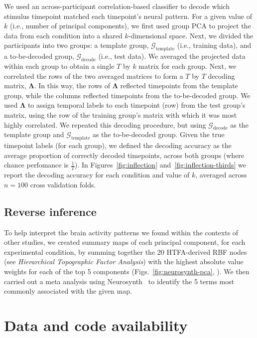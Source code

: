 \documentclass[english, 11pt]{article}
\begin{document}
We used an across-participant correlation-based classifier to decode which
stimulus timepoint matched each timepoint's neural pattern. For a given value
of $k$ (i.e., number of principal components), we first used group PCA to
project the data from each condition into a shared $k$-dimensional space. Next,
we divided the participants into two groups: a template group,
$\mathcal{G}_{\mathrm{template}}$ (i.e., training data), and a to-be-decoded
group, $\mathcal{G}_{\mathrm{decode}}$ (i.e., test data). We averaged the
projected data within each group to obtain a single $T$ by $k$ matrix for each
group. Next, we correlated the rows of the two averaged matrices to form a $T$
by $T$ decoding matrix, $\mathbf{\Lambda}$. In this way, the rows of
$\mathbf{\Lambda}$ reflected timepoints from the template group, while the
columns reflected timepoints from the to-be-decoded group. We used
$\mathbf{\Lambda}$ to assign temporal labels to each timepoint (row) from the
test group's matrix, using the row of the training group's matrix with which it
was most highly correlated. We repeated this decoding procedure, but using
$\mathcal{G}_{\mathrm{decode}}$ as the template group and
$\mathcal{G}_{\mathrm{template}}$ as the to-be-decoded group. Given the true
timepoint labels (for each group), we defined the decoding accuracy as the
average proportion of correctly decoded timepoints, across both groups (where
chance perfomance is $\frac{1}{T}$). In Figures~\ref{fig:inflection}
and~\ref{fig:inflection-thirds} we report the decoding accuracy for each
condition and value of $k$, averaged across $n = 100$ cross validation folds.

\subsection*{Reverse inference}

To help interpret the brain activity patterns we found within the contexts of
other studies, we created summary maps of each principal component, for each
experimental condition, by summing together the 20 HTFA-derived RBF nodes (see
\textit{Hierarchical Topographic Factor Analysis}) with the highest absolute
value weights for each of the top 5 components (Figs.~\ref{fig:neurosynth-pca},
\synthThirds). We then carried out a meta analysis using
Neurosynth~\citep{RubiEtal17} to identify the 5 terms most commonly associated
with the given map.


\section*{Data and code availability}
\end{document}
